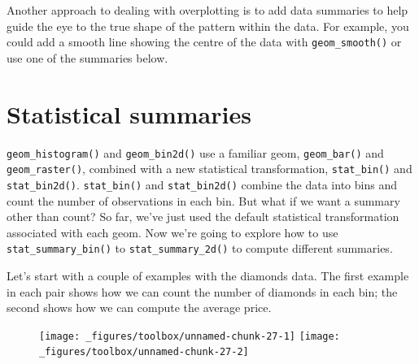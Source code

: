 Another approach to dealing with overplotting is to add data summaries
to help guide the eye to the true shape of the pattern within the data.
For example, you could add a smooth line showing the centre of the data
with \texttt{geom\_smooth()} or use one of the summaries below.

\hypertarget{sec:summary}{\section{Statistical
summaries}\label{sec:summary}}

 

\texttt{geom\_histogram()} and \texttt{geom\_bin2d()} use a familiar
geom, \texttt{geom\_bar()} and \texttt{geom\_raster()}, combined with a
new statistical transformation, \texttt{stat\_bin()} and
\texttt{stat\_bin2d()}. \texttt{stat\_bin()} and \texttt{stat\_bin2d()}
combine the data into bins and count the number of observations in each
bin. But what if we want a summary other than count? So far, we've just
used the default statistical transformation associated with each geom.
Now we're going to explore how to use \texttt{stat\_summary\_bin()} to
\texttt{stat\_summary\_2d()} to compute different summaries.

Let's start with a couple of examples with the diamonds data. The first
example in each pair shows how we can count the number of diamonds in
each bin; the second shows how we can compute the average price.

\begin{Shaded}
\begin{Highlighting}[]
\StringTok{ }
\StringTok{  }\NormalTok{()}

\StringTok{ }
\StringTok{  }\NormalTok{(} \NormalTok{, } 
\end{Highlighting}
\end{Shaded}

\begin{figure}[H]
  \texttt{[image: \_figures/toolbox/unnamed-chunk-27-1]}%
  \texttt{[image: \_figures/toolbox/unnamed-chunk-27-2]}
\end{figure}

